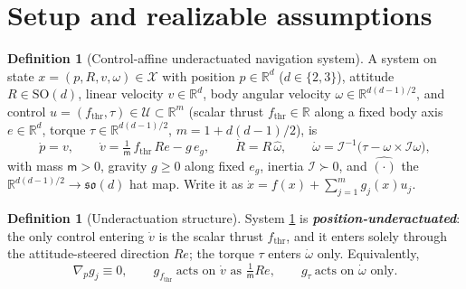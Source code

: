 \documentclass[11pt]{article}
\theoremstyle{plain}
\theoremstyle{definition}
\newtheorem{definition}[theorem]{Definition}
\theoremstyle{remark}
\newcommand{\R}{\mathbb{R}}
\newcommand{\calX}{\mathcal{X}}
\newcommand{\calU}{\mathcal{U}}
\newcommand{\SO}{\mathrm{SO}}
\newcommand{\mass}{\mathsf m}
\newcommand{\inertia}{\mathcal I}
\newcommand{\grad}{\nabla}
\begin{document}
\section{Setup and realizable assumptions}\label{sec:setup}

\begin{definition}[Control-affine underactuated navigation system]\label{def:sys}
A system on state $x=(p,R,v,\omega)\in\calX$ with
position $p\in\R^d$ ($d\in\{2,3\}$),
attitude $R\in\SO(d)$,
linear velocity $v\in\R^d$,
body angular velocity $\omega\in\R^{d(d-1)/2}$,
and control $u=(f_{\mathrm{thr}},\tau)\in\calU\subset\R^{m}$
(scalar thrust $f_{\mathrm{thr}}\in\R$ along a fixed body axis $e\in\R^d$, torque
$\tau\in\R^{d(d-1)/2}$, $m=1+d(d-1)/2$), is
\begin{equation}
\dot p = v,\qquad
\dot v = \tfrac{1}{\mass}\,f_{\mathrm{thr}}\,R e - g\,e_g,\qquad
\dot R = R\,\widehat{\omega},\qquad
\dot\omega = \inertia^{-1}\!\big(\tau-\omega\times\inertia\omega\big),
\end{equation}
with mass $\mass>0$, gravity $g\ge0$ along fixed $e_g$, inertia $\inertia\succ0$, and
$\widehat{(\cdot)}$ the $\R^{d(d-1)/2}\!\to\mathfrak{so}(d)$ hat map. Write it as
$\dot x=f(x)+\sum_{j=1}^m g_j(x)u_j$.
\end{definition}

\begin{definition}[Underactuation structure]\label{def:under}
System \cref{def:sys} is \textbf{\emph{position-underactuated}}: the only control entering
$\dot v$ is the scalar thrust $f_{\mathrm{thr}}$, and it enters solely through the
attitude-steered direction $Re$; the torque $\tau$ enters $\dot\omega$ only. Equivalently,
\begin{equation}
\grad_p g_j \equiv 0,\qquad
g_{f_{\mathrm{thr}}}\ \text{acts on }\dot v\text{ as }\tfrac1{\mass}Re,\qquad
g_{\tau}\ \text{acts on }\dot\omega\text{ only.}
\end{equation}
\end{definition}
\end{document}
